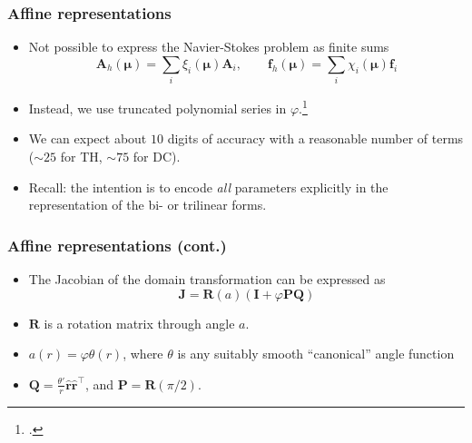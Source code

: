 \begin{frame}
  \frametitle{Affine representations}

  \begin{itemize}
  \item Not possible to express the Navier-Stokes problem as finite sums
    \[
      \bm A_h(\bm \mu) = \textstyle \sum_i \xi_i(\bm \mu) \bm A_i, \qquad
      \bm f_h(\bm \mu) = \textstyle \sum_i \chi_i(\bm \mu) \bm f_i
    \]
  \item Instead, we use truncated polynomial series in $\varphi$.\footcite{Fonn2018fdc}
  \item We can expect about $10$ digits of accuracy with a reasonable number of terms
    (${\sim}25$ for TH, ${\sim}75$ for DC).
  \item Recall: the intention is to encode \emph{all} parameters explicitly in the representation of
    the bi- or trilinear forms.
  \end{itemize}
\end{frame}

\begin{frame}
  \frametitle{Affine representations (cont.)}

  \begin{itemize}
  \item The Jacobian of the domain transformation can be expressed as
    \[
      \bm J = \bm R(a) (\bm I + \varphi \bm P \bm Q)
    \]
  \item $\bm R$ is a rotation matrix through angle $a$.
  \item $a(r) = \varphi \theta(r)$, where $\theta$ is any suitably smooth
    ``canonical'' angle function
    \begin{center}
    \end{center}
  \item $\bm Q = \frac{\theta'}{r} \hat{\bm r} \hat{\bm r}^\intercal$,
    and $\bm P = \bm R(\pi/2)$.
  \end{itemize}
\end{frame}

